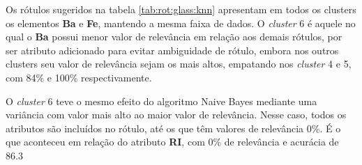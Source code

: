 Os rótulos sugeridos na tabela \ref{tab:rot:glass:knn} apresentam em todos os clusters os elementos \textbf{Ba} e \textbf{Fe}, mantendo a mesma faixa de dados. O \textit{cluster} 6 é aquele no qual o \textbf{Ba} possui menor valor de relevância em relação aos demais rótulos, por ser atributo adicionado para evitar ambiguidade de rótulo, embora nos outros clusters seu valor de relevância sejam os mais altos, empatando nos \textit{cluster} 4 e 5, com 84\% e 100\% respectivamente. 


O \textit{cluster} 6 teve o mesmo efeito do algoritmo Naive Bayes mediante uma variância com valor mais alto ao maior valor de relevância. Nesse caso, todos os atributos são incluídos no rótulo, até os que têm valores de relevância 0\%. É o que aconteceu em relação do atributo \textbf{RI}, com 0\% de relevância e acurácia de 86.3%



